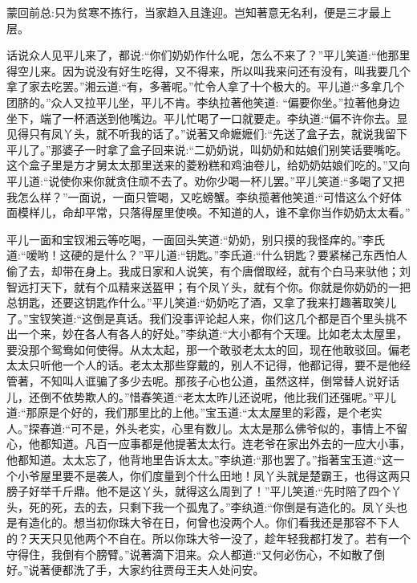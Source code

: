 
\begin{parag}
    \begin{note}蒙回前总:只为贫寒不拣行，当家趋入且逢迎。岂知著意无名利，便是三才最上层。\end{note}
\end{parag}


\begin{parag}
    话说众人见平儿来了，都说:“你们奶奶作什么呢，怎么不来了？”平儿笑道:“他那里得空儿来。因为说没有好生吃得，又不得来，所以叫我来问还有没有，叫我要几个拿了家去吃罢。”湘云道:“有，多著呢。”忙令人拿了十个极大的。平儿道:“多拿几个团脐的。”众人又拉平儿坐，平儿不肯。李纨拉著他笑道: “偏要你坐。”拉著他身边坐下，端了一杯酒送到他嘴边。平儿忙喝了一口就要走。李纨道:“偏不许你去。显见得只有凤丫头，就不听我的话了。”说著又命嬷嬷们:“先送了盒子去，就说我留下平儿了。”那婆子一时拿了盒子回来说:“二奶奶说，叫奶奶和姑娘们别笑话要嘴吃。这个盒子里是方才舅太太那里送来的菱粉糕和鸡油卷儿，给奶奶姑娘们吃的。”又向平儿道:“说使你来你就贪住顽不去了。劝你少喝一杯儿罢。”平儿笑道:“多喝了又把我怎么样？”一面说，一面只管喝，又吃螃蟹。李纨揽著他笑道:“可惜这么个好体面模样儿，命却平常，只落得屋里使唤。不知道的人，谁不拿你当作奶奶太太看。”
\end{parag}


\begin{parag}
    平儿一面和宝钗湘云等吃喝，一面回头笑道:“奶奶，别只摸的我怪痒的。”李氏道:“嗳哟！这硬的是什么？”平儿道:“钥匙。”李氏道:“什么钥匙？要紧梯己东西怕人偷了去，却带在身上。我成日家和人说笑，有个唐僧取经，就有个白马来驮他；刘智远打天下，就有个瓜精来送盔甲；有个凤丫头，就有个你。你就是你奶奶的一把总钥匙，还要这钥匙作什么。”平儿笑道:“奶奶吃了酒，又拿了我来打趣著取笑儿了。”宝钗笑道:“这倒是真话。我们没事评论起人来，你们这几个都是百个里头挑不出一个来，妙在各人有各人的好处。”李纨道:“大小都有个天理。比如老太太屋里，要没那个鸳鸯如何使得。从太太起，那一个敢驳老太太的回，现在他敢驳回。偏老太太只听他一个人的话。老太太那些穿戴的，别人不记得，他都记得，要不是他经管著，不知叫人诓骗了多少去呢。那孩子心也公道，虽然这样，倒常替人说好话儿，还倒不依势欺人的。”惜春笑道:“老太太昨儿还说呢，他比我们还强呢。”平儿道:“那原是个好的，我们那里比的上他。”宝玉道:“太太屋里的彩霞，是个老实人。”探春道:“可不是，外头老实，心里有数儿。太太是那么佛爷似的，事情上不留心，他都知道。凡百一应事都是他提著太太行。连老爷在家出外去的一应大小事，他都知道。太太忘了，他背地里告诉太太。”李纨道:“那也罢了。”指著宝玉道:“这一个小爷屋里要不是袭人，你们度量到个什么田地！凤丫头就是楚霸王，也得这两只膀子好举千斤鼎。他不是这丫头，就得这么周到了！”平儿笑道:“先时陪了四个丫头，死的死，去的去，只剩下我一个孤鬼了。”李纨道:“你倒是有造化的。凤丫头也是有造化的。想当初你珠大爷在日，何曾也没两个人。你们看我还是那容不下人的？天天只见他两个不自在。所以你珠大爷一没了，趁年轻我都打发了。若有一个守得住，我倒有个膀臂。”说著滴下泪来。众人都道:“又何必伤心，不如散了倒好。”说著便都洗了手，大家约往贾母王夫人处问安。
\end{parag}


